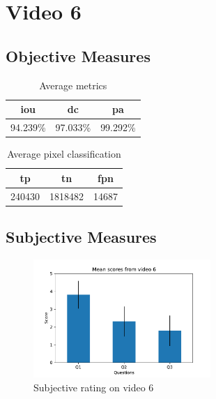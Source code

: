 
\section{Video 6}
\subsection{Objective Measures}

\begin{minipage}[c]{0.475\textwidth}
\begin{table}[H]
    \centering
    \begin{tabular}{||c c c||} 
        \hline
        \acrshort{iou} & \acrshort{dc} & \acrshort{pa} \\ [0.5ex] 
        \hline\hline
        94.239\% & 97.033\% & 99.292\% \\ [1ex] 
        \hline
    \end{tabular}
    \caption{Average metrics}
    \label{tab:metrics_video_6}
\end{table}
\end{minipage}
\begin{minipage}[c]{0.475\textwidth}
\begin{table}[H]
    \centering
    \begin{tabular}{||c c c||} 
        \hline
        \acrshort{tp} & \acrshort{tn} & \acrshort{fpn} \\ [0.5ex] 
        \hline\hline
        240430 & 1818482 & 14687 \\ [1ex] 
        \hline
    \end{tabular}
    \caption{Average pixel classification}
    \label{tab:pixels_video_6}
\end{table}
\end{minipage}

\subsection{Subjective Measures}

\begin{figure}[H]
    \centering
    \includegraphics[width=0.6\textwidth]{img/subjective_measures/analysis/video_6.pdf}
    \caption{Subjective rating on video 6}
    \label{fig:visual_subj_vid6}
\end{figure}


